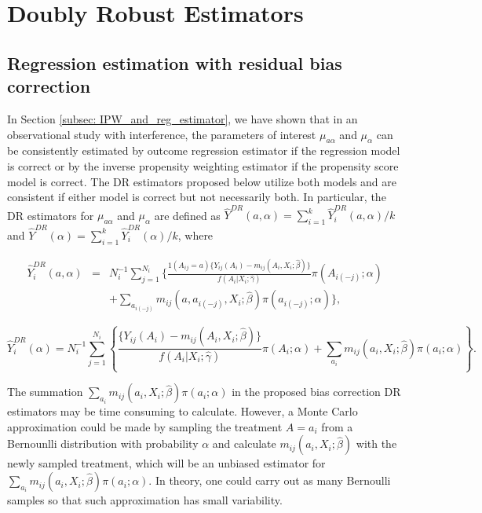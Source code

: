 \documentclass[oupdraft]{bio}
\begin{document}
\vspace{-0.3cm}
\section{Doubly Robust Estimators}\label{subsec: DE_estimator}

\subsection{Regression estimation with residual bias correction}

 In Section \ref{subsec: IPW_and_reg_estimator}, we have shown that in an observational study with interference, the parameters of interest $\mu_{a\alpha}$ and $\mu_{\alpha}$ can be consistently estimated by outcome regression estimator if the regression model is correct or by the inverse propensity weighting estimator if the propensity score model is correct.
The DR estimators proposed below utilize both models and are consistent if either model is correct but not necessarily both. In particular, the DR estimators for $\mu_{a\alpha}$ and $\mu_{\alpha}$ are defined as  $ \widehat{Y}^{DR}(a,\alpha)= \sum_{i=1}^k\widehat{Y}_i^{DR}(a,\alpha)/k$ and $ \widehat{Y}^{DR}(\alpha)= \sum_{i=1}^k\widehat{Y}_i^{DR}(\alpha)/k$, where


\vspace{-0.8cm}
\begin{eqnarray*}\label{eq: DR_estimator}
  \widehat{Y}_i^{DR}(a,\alpha)&=&N_i^{-1}\sum_{j=1}^{N_i}\Biggl\{\frac{1(A_{ij}=a)\{Y_{ij}(A_i)-m_{ij}(A_i,X_i;\hat\beta)\}}{{f}(A_i|X_i;\hat\gamma)}
  \pi(A_{i(-j)};\alpha)\\&&+
  \sum_{a_{i(-j)}}m_{ij}(a,a_{i(-j)},X_i;\hat\beta)\pi(a_{i(-j)};\alpha)
 \Biggr\},
 \end{eqnarray*}

 \vspace{-0.6cm}
 \begin{equation*}
  \widehat{Y}_i^{DR}(\alpha)=N_i^{-1}\sum_{j=1}^{N_i}\left\{
 \frac{\{Y_{ij}(A_i)-m_{ij}(A_i,X_i;\hat\beta)\}}{{f}(A_i|X_i;\hat\gamma)}\pi(A_i;\alpha)+
  \sum_{a_i}m_{ij}(a_i,X_i;\hat\beta)\pi(a_i;\alpha)\right\}.
\end{equation*}


\noindent The summation $ \sum_{a_i}m_{ij}(a_i,X_i;\hat\beta)\pi(a_i;\alpha)$ in the proposed bias correction DR estimators may be time consuming to calculate. However, a Monte Carlo approximation could be made by sampling the treatment $A=a_i$ from a Bernounlli distribution with probability $\alpha$ and calculate $m_{ij}(a_i,X_i;\hat\beta)$ with the newly sampled treatment, which will be an unbiased estimator for $\sum_{a_i}m_{ij}(a_i,X_i;\hat\beta)\pi(a_i;\alpha)$. In theory, one could carry out as many Bernoulli samples so that such approximation has small variability.
\end{document}
